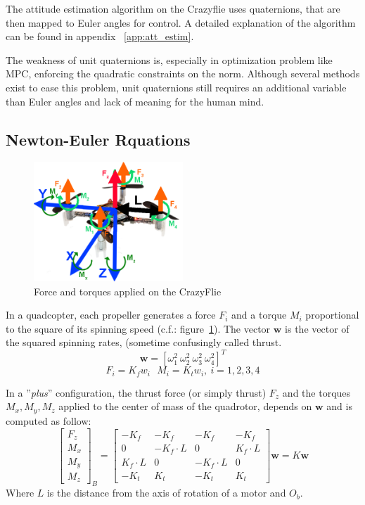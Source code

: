\documentclass[a4paper, 12pt]{report}
\begin{document}
The attitude estimation algorithm on the Crazyflie uses quaternions, that are then mapped to Euler angles for control. A detailed explanation of the algorithm can be found in appendix ~\ref{app:att_estim}.

The weakness of unit quaternions is, especially in optimization problem like MPC, enforcing the quadratic constraints on the norm. Although several methods exist to ease this problem, unit quaternions still requires an additional variable than Euler angles and lack of meaning for the human mind.
\subsection{Newton-Euler Rquations}
\label{sec:dynamicsEquations}

\begin{figure}[htbp]
\centering
\includegraphics[width=0.5\textwidth]{Images/forceMoments}
\caption{Force and torques applied on the CrazyFlie}
\label{fig:forceMoment}
\end{figure}

In a quadcopter, each propeller generates a force $F_i$ and a torque $M_i$ proportional to the square of its spinning speed  (c.f.: figure~\ref{fig:forceMoment}). The vector $\boldsymbol{w}$ is the vector of the squared spinning rates, (sometime confusingly called thrust.
\[ \boldsymbol{w} = [\omega^2_1 \  \omega^2_2 \  \omega^2_3 \  \omega^2_4]^T \]
\[F_i =  K_f  w_i \ \ \ M_i = K_t  w_i  ,\  i = 1,2,3,4\]

In a ''\emph{plus}'' configuration, the thrust force (or simply thrust) $F_{z}$ and the torques $M_{x}, M_{y}, M_{z}$  applied to the center of mass of the quadrotor, depends on $\boldsymbol{w}$ and is computed as follow:
\[  
\begin{bmatrix}
F_{z}\\ 
M_{x}\\
M_{y}\\
M_{z}
 \end{bmatrix}_B
=
\begin{bmatrix}
-K_f & -K_f & -K_f & -K_f\\
0 & -K_f \cdot L & 0 & K_f \cdot L\\
K_f \cdot L & 0 & -K_f \cdot L & 0\\
-K_t & K_t & -K_t & K_t
\end{bmatrix}
\textbf{w} = K\textbf{w}
\]
Where $L$ is the distance from the axis of rotation of a motor and $O_b$.
\end{document}
